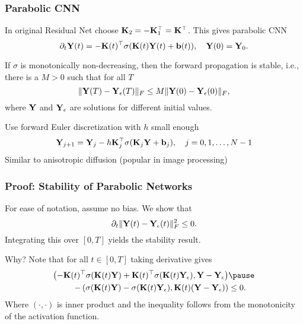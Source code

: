 \documentclass[12pt,fleqn,handout]{beamer}
\begin{document}
\begin{frame}
	\frametitle{Parabolic CNN}

		In original Residual Net choose ${\bf K}_2 = - {\bf K}_1^\top = {\bf K}^\top$.
		This gives parabolic CNN
		$$
		 \partial_t {\bf Y}(t) = -{\bf K}(t)^{\top} \sigma({\bf K}(t) {\bf Y}(t)  + {\bf b}(t)), \quad {\bf Y}(0) = {\bf Y}_0.
		$$
		
	 \pause
	
	\begin{theorem}
	    If $\sigma$ is monotonically non-decreasing, then the forward propagation is stable, i.e., there is a $M>0$ such that for all $T$
	    \begin{equation*}
	        \|{\bf Y}(T) - {\bf Y}_{\epsilon}(T)\|_F \leq M \|{\bf Y}(0) - {\bf Y}_{\epsilon}(0)\|_F,
	    \end{equation*}
	    where ${\bf Y}$ and ${\bf Y}_{\epsilon}$ are solutions for different initial values.
	\end{theorem}
		
	 	Use forward Euler discretization with $h$ small enough
	 	\begin{equation*}
	 		{\bf Y}_{j+1} = {\bf Y}_{j}-h{\bf K}_j^{\top} \sigma({\bf K}_j {\bf Y}  + {\bf b}_j), \quad j=0,1,\ldots,N-1
	 	\end{equation*}
	 	Similar to anisotropic diffusion (popular in image processing)~\cite{ChenPock2017}
\end{frame}

\begin{frame}
	\frametitle{Proof: Stability of Parabolic Networks}
	

	    For ease of notation,  assume no bias.
		We show that 
			    \begin{equation*}
			        \partial_t \|{\bf Y}(t) - {\bf Y}_{\epsilon}(t)\|_F^2 \leq 0.
			    \end{equation*}
		Integrating this over $[0,T]$ yields the stability result.
		
		\pause
	    Why? Note that for all $t \in [0,T]$ taking derivative gives
	    \begin{eqnarray*}
			\left( -\bfK(t)^\top \sigma(\bfK(t) \bfY) + \bfK(t)^\top\sigma(\bfK(t) \bfY_\epsilon),  \bfY- \bfY_{\epsilon}\right)& \pause\\
	         -\left( \sigma(\bfK(t) \bfY) - \sigma(\bfK(t) \bfY_\epsilon),  \bfK(t) (\bfY- \bfY_{\epsilon}) \right)
	        & \leq  0.
	    \end{eqnarray*}
	    Where $(\cdot,\cdot)$ is inner product and the inequality follows from the monotonicity of the activation function.
	
\end{frame}
\end{document}

